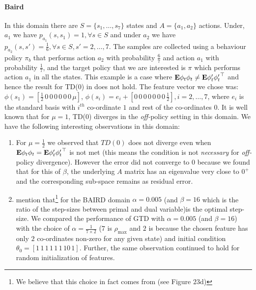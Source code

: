 \paragraph{Baird} In this domain there are $S=\{s_1,\ldots,s_7\}$ states and $A=\{a_1,a_2\}$ actions. Under, $a_1$ we have $p_{a_1}(s,s_1)=1, \forall s\in S$ and under $a_2$ we have $p_{a_2}(s,s')=\frac{1}{6}, \forall s\in S, s'=2,\ldots,7$. The samples are collected using a behaviour policy $\pi_b$ that performs action $a_2$ with probability $\frac{6}{7}$ and action $a_1$ with probability $\frac17$, and the target policy that we are interested is $\pi$ which performs action $a_1$ in all the states. This example is a case where $\mathbf{E}{\phi_t\phi_t}\neq\mathbf{E}{\phi'_t{\phi'_t}^\top}$ and hence the result for TD(0) in  does not hold. The feature vector we chose was: $\phi(s_1)=[\frac{1}{2}\,0\,0\,0\,0\,0\,0\,\mu]$, $\phi(s_i)=e_i+[0\,0\,0\,0\,0\,0\,0\,\frac{1}{2}], i=2,\ldots,7$, where $e_i$ is the standard basis with $i^{th}$ co-ordinate $1$ and rest of the co-ordinates $0$. It is well known that for $\mu=1$, TD(0) diverges in the \emph{off-}policy setting in this domain. We have the following interesting observations in this domain:
\begin{enumerate}[leftmargin=*]
\item For $\mu=\frac{1}{2}$ we observed that $TD(0)$ does not diverge even when $\mathbf{E}{\phi_t\phi_t}=\mathbf{E}{\phi'_t{\phi'_t}^\top}$ is not met (this means the condition is not \emph{necessary} for \emph{off-}policy divergence). However the error did not converge to $0$ because we found that for this of $\beta$, the underlying $A$ matrix has an eigenvalue very close to $0^+$ and the corresponding sub-space remains as residual error.
\item  \citet{gtdmp} mention that\footnote{We believe that this choice in fact comes from \cite{dann} (see Figure $23$d) } for the BAIRD domain $\alpha=0.005$ (and $\beta=16$ which is the ratio of the step-sizes between primal and dual variable)is the optimal step-size. We compared the performance of GTD with $\alpha=0.005$ (and $\beta=16$) with the choice of $\alpha=\frac{1}{7\times 2}$ ($7$ is $\rho_{\max}$ and $2$ is because the chosen feature has only $2$ co-ordinates non-zero for any given state) and initial condition $\theta_0=[1\, 1\, 1\, 1\, 1\, 1\, 10\, 1]$. Further, the same observation continued to hold for random initialization of features.
\end{enumerate}


